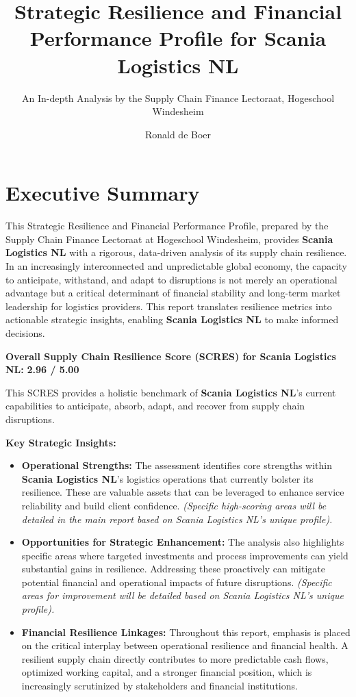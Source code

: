 \documentclass[
  oneside,
  open=any,
  fontsize=11pt]{scrbook}
\title{Strategic Resilience and Financial Performance Profile for Scania
Logistics NL}
\subtitle{An In-depth Analysis by the Supply Chain Finance Lectoraat,
Hogeschool Windesheim}
\author{Ronald de Boer}
\date{}
\providecommand{\tightlist}{%
  \setlength{\itemsep}{0pt}\setlength{\parskip}{0pt}}
\renewcommand*\contentsname{Table of contents}
\newcommand\contentsname{Table of contents}
\begin{document}
\frontmatter
\maketitle

\renewcommand*\contentsname{Table of contents}
{
\setcounter{tocdepth}{2}
\tableofcontents
}
\listoffigures
\listoftables

\mainmatter
\newpage

\chapter{Executive Summary}\label{executive-summary}

This Strategic Resilience and Financial Performance Profile, prepared by
the Supply Chain Finance Lectoraat at Hogeschool Windesheim, provides
\textbf{Scania Logistics NL} with a rigorous, data-driven analysis of
its supply chain resilience. In an increasingly interconnected and
unpredictable global economy, the capacity to anticipate, withstand, and
adapt to disruptions is not merely an operational advantage but a
critical determinant of financial stability and long-term market
leadership for logistics providers. This report translates resilience
metrics into actionable strategic insights, enabling \textbf{Scania
Logistics NL} to make informed decisions.

\textbf{Overall Supply Chain Resilience Score (SCRES) for Scania
Logistics NL:} \textbf{2.96 / 5.00}

This SCRES provides a holistic benchmark of \textbf{Scania Logistics
NL}'s current capabilities to anticipate, absorb, adapt, and recover
from supply chain disruptions.

\textbf{Key Strategic Insights:}

\begin{itemize}
\tightlist
\item
  \textbf{Operational Strengths:} The assessment identifies core
  strengths within \textbf{Scania Logistics NL}'s logistics operations
  that currently bolster its resilience. These are valuable assets that
  can be leveraged to enhance service reliability and build client
  confidence. \emph{(Specific high-scoring areas will be detailed in the
  main report based on Scania Logistics NL's unique profile).}
\item
  \textbf{Opportunities for Strategic Enhancement:} The analysis also
  highlights specific areas where targeted investments and process
  improvements can yield substantial gains in resilience. Addressing
  these proactively can mitigate potential financial and operational
  impacts of future disruptions. \emph{(Specific areas for improvement
  will be detailed based on Scania Logistics NL's unique profile).}
\item
  \textbf{Financial Resilience Linkages:} Throughout this report,
  emphasis is placed on the critical interplay between operational
  resilience and financial health. A resilient supply chain directly
  contributes to more predictable cash flows, optimized working capital,
  and a stronger financial position, which is increasingly scrutinized
  by stakeholders and financial institutions.
\end{itemize}
\end{document}
